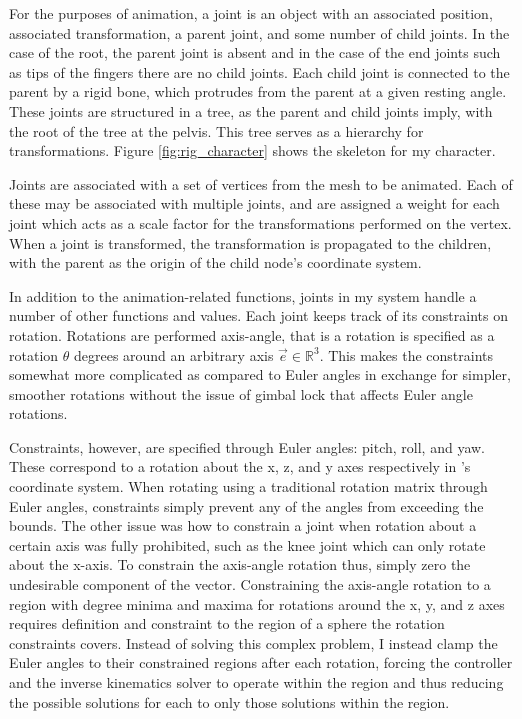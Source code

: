 For the purposes of animation, a joint is an object with an associated position, associated transformation, a parent joint, and some number of child joints.  In the case of the root, the parent joint is absent and in the case of the end joints such as tips of the fingers there are no child joints.  Each child joint is connected to the parent by a rigid bone, which protrudes from the parent at a given resting angle.  These joints are structured in a tree, as the parent and child joints imply, with the root of the tree at the pelvis.  This tree serves as a hierarchy for transformations.  Figure \ref{fig:rig_character} shows the skeleton for my character.

Joints are associated with a set of vertices from the mesh to be animated.  Each of these may be associated with multiple joints, and are assigned a weight for each joint which acts as a scale factor for the transformations performed on the vertex.  When a joint is transformed, the transformation is propagated to the children, with the parent as the origin of the child node's coordinate system.

In addition to the animation-related functions, joints in my system handle a number of other functions and values.  Each joint keeps track of its constraints on rotation.  Rotations are performed axis-angle, that is a rotation is specified as a rotation $\theta$ degrees around an arbitrary axis $\vec{e} \in \mathbb{R}^3$. This makes the constraints somewhat more complicated as compared to Euler angles in exchange for simpler, smoother rotations without the issue of gimbal lock that affects Euler angle rotations.

Constraints, however, are specified through Euler angles: pitch, roll, and yaw.  These correspond to a rotation about the x, z, and y axes respectively in \unity{}'s coordinate system.  When rotating using a traditional rotation matrix through Euler angles, constraints simply prevent any of the angles from exceeding the bounds.  The other issue was how to constrain a joint when rotation about a certain axis was fully prohibited, such as the knee joint which can only rotate about the x-axis.  To constrain the axis-angle rotation thus, simply zero the undesirable component of the vector.  Constraining the axis-angle rotation to a region with degree minima and maxima for rotations around the x, y, and z axes requires definition and constraint to the region of a sphere the rotation constraints covers.  Instead of solving this complex problem, I instead clamp the Euler angles to their constrained regions after each rotation, forcing the controller and the inverse kinematics solver to operate within the region and thus reducing the possible solutions for each to only those solutions within the region.

